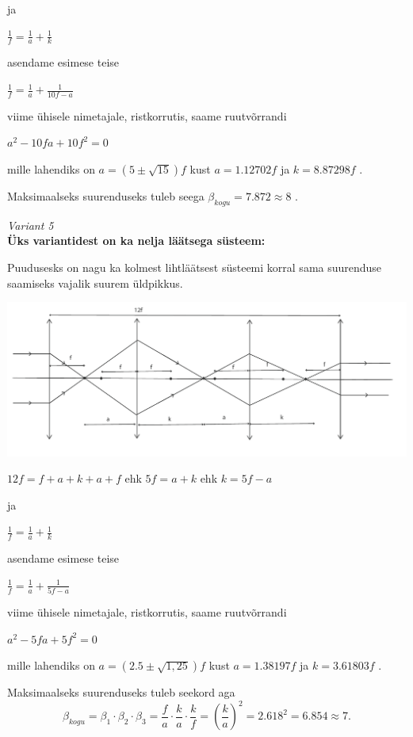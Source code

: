 ja

$ \frac {1}{f} = \frac{1}{a} + \frac{1}{k} $

asendame esimese teise

$ \frac {1}{f} = \frac {1}{a} + \frac {1}{10f - a} $

viime ühisele nimetajale, ristkorrutis, saame ruutvõrrandi

$ a^2 - 10fa + 10f^2 =0 $

mille lahendiks on $ a = (5 \pm \sqrt{15}) f $ kust $a=1.12702f $ ja $k=8.87298f$ .

Maksimaalseks suurenduseks tuleb seega $ {\beta}_{kogu} = 7.872 \approx 8 $ .

\emph{Variant 5}\\
\textbf {Üks variantidest on ka nelja läätsega süsteem:}

Puudusesks on nagu ka kolmest lihtläätsest süsteemi korral sama suurenduse saamiseks vajalik suurem üldpikkus.

\vspace{-10pt}
  \begin{center}
    \includegraphics[width=1\textwidth]{2020-v2g-10-sol5.pdf}
  \end{center}
  \vspace{-10pt}


$ 12f = f + a + k + a + f $ ehk $ 5f = a + k $ ehk $ k = 5f - a $

ja

$ \frac {1}{f} = \frac{1}{a} + \frac{1}{k} $

asendame esimese teise

$ \frac{1}{f} = \frac {1}{a} + \frac{1}{5f - a} $

viime ühisele nimetajale, ristkorrutis, saame ruutvõrrandi

$ a^2 - 5fa + 5f^2 =0 $

mille lahendiks on $ a = (2.5 \pm \sqrt{1,25}) f $ kust $a=1.38197f $ ja $k=3.61803f$ .

Maksimaalseks suurenduseks tuleb seekord aga  
\[ {\beta}_{kogu} = {\beta}_1 \cdot {\beta}_2 \cdot {\beta}_3 = \frac {f}{a} \cdot \frac {k}{a} \cdot \frac {k}{f} = {(\frac {k}{a})}^2 = 2.618^2 = 6.854 \approx 7. \]
\probend